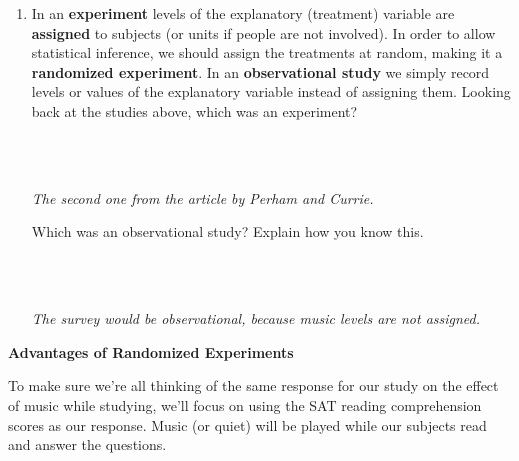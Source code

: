 \begin{enumerate}
\item In an {\bf experiment} levels of the explanatory (treatment)
  variable are {\bf assigned} to subjects (or units if people are not
  involved). In order to allow statistical inference, we should assign the
  treatments at random, making it a {\bf randomized experiment}. 
  In an {\bf observational study} we simply record levels or values of
  the explanatory variable instead of assigning them.  Looking back at
  the studies above, which was an experiment?
\begin{students}
        \vspace{1cm}\\
\end{students}
\begin{key}
  \\ {\it  The second one from the article by Perham and Currie.}\\
\end{key}
  Which was an observational study?  Explain how you know this.
\begin{students}
        \vspace{1cm}\\
\end{students}
\begin{key}
  \\ {\it  The survey would be observational, because music levels are
    not assigned.}
\end{key}

\end{enumerate}


\begin{center}
  {\bf Advantages of Randomized Experiments}
\end{center}

To make sure we're all thinking of the same response for our study on
the effect of music while studying, we'll focus on using the SAT
reading comprehension scores as our response.  Music (or quiet) will
be played while our subjects read and answer the questions.

